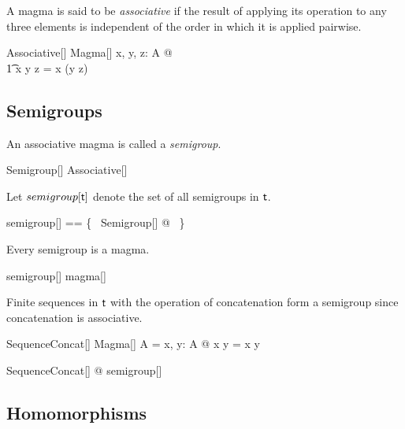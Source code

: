 \documentclass{amsart}
\begin{document}
A magma is said to be \textit{associative} if the result of applying its operation to any three elements
is independent of the order in which it is applied pairwise.

\begin{schema}{Associative}[\genT]
	Magma[\genT]
\where
	\forall x, y, z: A @ \\
	\t1	x \opG y \opG z = x \opG (y \opG z)
\end{schema}

\subsection{Semigroups}

An associative magma is called a \textit{semigroup}.

\begin{schema}{Semigroup}[\genT]
	Associative[\genT]
\end{schema}

Let $semigroup[\mathsf{t}]$ denote the set of all semigroups in $\mathsf{t}$.

\begin{zed}
	semigroup[\genT] == \{~ Semigroup[\genT] @ \strucA  ~\}
\end{zed}

\begin{remark} Every semigroup is a magma.

\begin{zed}
	semigroup[\setT] \subseteq magma[\setT]
\end{zed}

\end{remark}

\begin{example}
Finite sequences in $\mathsf{t}$ with the operation of concatenation form a semigroup
since concatenation is associative.

\begin{schema}{SequenceConcat}[\genT]
	Magma[\seq \genT]
\where
	A = \seq \genT
\also
	\forall x, y: A @ x \opG y = x \cat y
\end{schema}

\begin{zed}
	\forall SequenceConcat[\setT] @ \strucA \in semigroup[\seq \setT]
\end{zed}

\end{example}

\subsection{Homomorphisms}
\end{document}
